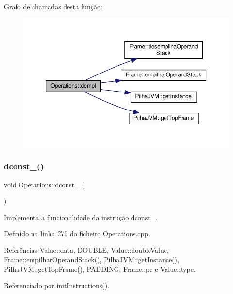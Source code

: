 Grafo de chamadas desta função\+:\nopagebreak
\begin{figure}[H]
\begin{center}
\leavevmode
\includegraphics[width=350pt]{classOperations_a89e1792d8c650c2274352c534cfbd7c0_cgraph}
\end{center}
\end{figure}
\mbox{\label{classOperations_abd7f711342c43f7fa4e93b41931e6c86}} 
\subsubsection{\texorpdfstring{dconst\+\_()}{dconst\_0()}}
{\footnotesize\ttfamily void Operations\+::dconst\+\_ (\begin{DoxyParamCaption}{ }\end{DoxyParamCaption})\hspace{0.3cm}{\ttfamily [private]}}



Implementa a funcionalidade da instrução dconst\+\_. 



Definido na linha 279 do ficheiro Operations.\+cpp.



Referências Value\+::data, D\+O\+U\+B\+LE, Value\+::double\+Value, Frame\+::empilhar\+Operand\+Stack(), Pilha\+J\+V\+M\+::get\+Instance(), Pilha\+J\+V\+M\+::get\+Top\+Frame(), P\+A\+D\+D\+I\+NG, Frame\+::pc e Value\+::type.



Referenciado por init\+Instructions().

